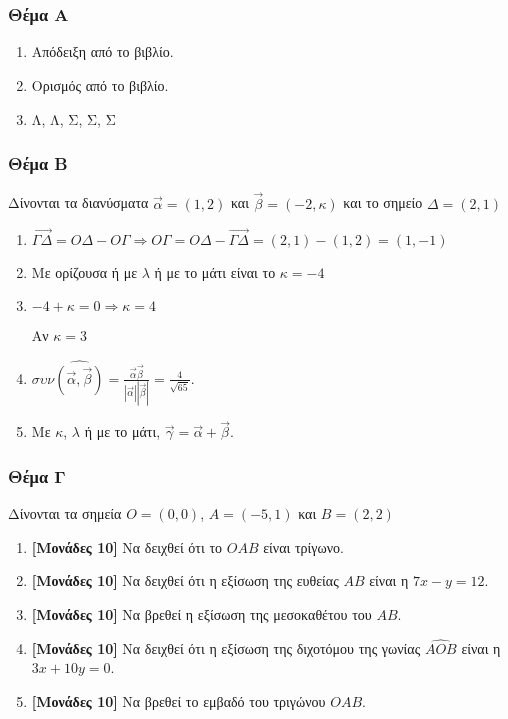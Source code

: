 \documentclass[12pt]{article}
\begin{document}
\part*{}

\section*{Θέμα Α}
  \noindent
  \begin{enumerate}
    \item Απόδειξη από το βιβλίο.
    \item Ορισμός από το βιβλίο.
    \item Λ, Λ, Σ, Σ, Σ
  \end{enumerate}

\section*{Θέμα Β}
  \noindent
  Δίνονται τα διανύσματα $\vec{α}=(1,2)$ και $\vec{β}=(-2,κ)$ και το σημείο $Δ=(2,1)$
  \begin{enumerate}
    \item $\overrightarrow{ΓΔ}=ΟΔ-ΟΓ \Rightarrow ΟΓ=ΟΔ-\overrightarrow{ΓΔ}=(2,1)-(1,2)=(1,-1)$
    \item Με ορίζουσα ή με $λ$ ή με το μάτι είναι το $κ=-4$
    \item $-4+κ=0 \Rightarrow κ=4$

    Αν $κ=3$
    \item $συν\widehat{(\vec{α},\vec{β})}=\frac{\vec{α}\vec{β}}{|\vec{α}||\vec{β}|}=\frac{4}{\sqrt{65}}$.
    \item Με $κ$, $λ$ ή με το μάτι, $\vec{γ}=\vec{α}+\vec{β}$.

  \end{enumerate}

\section*{Θέμα Γ}
  \noindent
  Δίνονται τα σημεία $Ο=(0,0)$, $Α=(-5,1)$ και $Β=(2,2)$
  \begin{enumerate}
    \item \textbf{[Μονάδες 10]} Να δειχθεί ότι το $ΟΑΒ$ είναι τρίγωνο.
    \item \textbf{[Μονάδες 10]} Να δειχθεί ότι η εξίσωση της ευθείας $ΑΒ$ είναι η $7x-y=12$.
    \item \textbf{[Μονάδες 10]} Να βρεθεί η εξίσωση της μεσοκαθέτου του $ΑΒ$.
    \item \textbf{[Μονάδες 10]} Να δειχθεί ότι η εξίσωση της διχοτόμου της γωνίας $\widehat{ΑΟΒ}$ είναι η $3x+10y=0$.
    \item \textbf{[Μονάδες 10]} Να βρεθεί το εμβαδό του τριγώνου $ΟΑΒ$.

  \end{enumerate}
\end{document}
